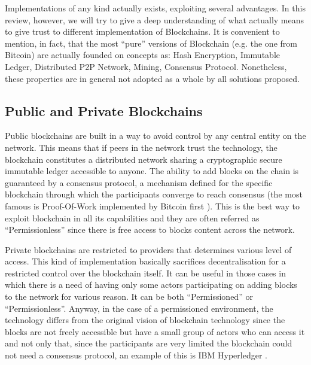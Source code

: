 \documentclass[preprint]{elsarticle}
\begin{document}
Implementations of any kind actually exists, exploiting several advantages. In this review, however, we will try to give a deep understanding of what actually means to give trust to different implementation of Blockchains. It is convenient to mention, in fact, that the most ``pure'' versions of Blockchain (e.g. the one from Bitcoin) are actually founded on concepts as: Hash Encryption, Immutable Ledger, Distributed P2P Network, Mining, Consensus Protocol. Nonetheless, these properties are in general not adopted as a whole by all solutions proposed.

\subsection{Public and Private Blockchains}
Public blockchains are built in a way to avoid control by any central entity on the network. This means that if peers in the network trust the technology, the blockchain constitutes a distributed network sharing a cryptographic secure immutable ledger accessible to anyone. The ability to add blocks on the chain is guaranteed by a consensus protocol, a mechanism defined for the specific blockchain through which the participants converge to reach consensus (the most famous is Proof-Of-Work implemented by Bitcoin first \cite{back2002hashcash}). This is the best way to exploit blockchain in all its capabilities and they are often referred as ``Permissionless'' since there is free access to blocks content across the network.

Private blockchains are restricted to providers that determines various level of access. This kind of implementation basically sacrifices decentralisation for a restricted control over the blockchain itself. It can be useful in those cases in which there is a need of having only some actors participating on adding blocks to the network for various reason. It can be both ``Permissioned'' or ``Permissionless''. Anyway, in the case of a permissioned environment, the technology differs from the original vision of blockchain technology since the blocks are not freely accessible but have a small group of actors who can access it and not only that, since the participants are very limited the blockchain could not need a consensus protocol, an example of this is IBM Hyperledger \cite{androulaki2018hyperledger}.
\end{document}
